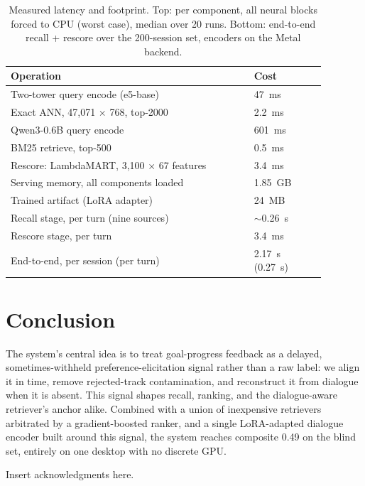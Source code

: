 \documentclass[sigconf]{acmart}
\begin{document}
\begin{table}
  \caption{Measured latency and footprint. Top: per component, all neural blocks
  forced to CPU (worst case), median over 20 runs. Bottom: end-to-end recall +
  rescore over the 200-session set, encoders on the Metal backend.}
  \label{tab:latency}
  \begin{tabular}{p{0.68\linewidth}p{0.20\linewidth}}
    \toprule
    \textbf{Operation} & \textbf{Cost} \\
    \midrule
    Two-tower query encode (e5-base) & 47~ms \\
    Exact ANN, 47,071 $\times$ 768, top-2000 & 2.2~ms \\
    Qwen3-0.6B query encode & 601~ms \\
    BM25 retrieve, top-500 & 0.5~ms \\
    Rescore: LambdaMART, 3,100 $\times$ 67 features & 3.4~ms \\
    Serving memory, all components loaded & 1.85~GB \\
    Trained artifact (LoRA adapter) & 24~MB \\
    Recall stage, per turn (nine sources) & $\sim$0.26~s \\
    Rescore stage, per turn & 3.4~ms \\
    End-to-end, per session (per turn) & 2.17~s (0.27~s) \\
    \bottomrule
  \end{tabular}
\end{table}

\section{Conclusion}

The system's central idea is to treat goal-progress feedback as a delayed,
sometimes-withheld preference-elicitation signal rather than a raw label: we
align it in time, remove rejected-track contamination, and reconstruct it from
dialogue when it is absent. This signal shapes recall, ranking, and the
dialogue-aware retriever's anchor alike. Combined with a union of inexpensive
retrievers arbitrated by a gradient-boosted ranker, and a single LoRA-adapted
dialogue encoder built around this signal, the system reaches composite 0.49
on the blind set, entirely on one desktop with no discrete GPU.

\begin{acks}
Insert acknowledgments here.
\end{acks}



\end{document}
